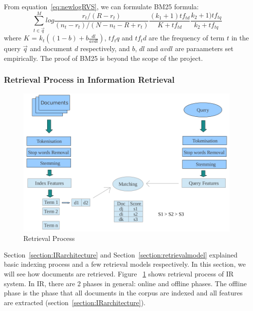 From equation~\ref{eq:newlogRVS}, we can formulate BM25 formula:
\begin{equation}~\label{eq:BM25}
\sum_{t \in \vec{q}}^M log \frac{r_t/(R - r_t)}{(n_t - r_t)/(N - n_t - R + r_t)} \frac{(k_1 + 1)tf_{td}}{K + tf_{td}} \frac{k_2 + 1)tf_{tq}}{k_2 + tf_{tq}}
\end{equation}
where $K$ = $k_t((1 - b) + b\frac{dl}{avdl})$, $tf_tq$ and $tf_td$ are the frequency of term $t$ in the query $\vec{q}$ and document $d$ respectively,
and $b$, $dl$ and $avdl$ are paraameters set empirically. The proof of BM25 is beyond the scope of the project.


\subsubsection{Retrieval Process in Information Retrieval}\label{section:retrieving}
\begin{figure}
\centering
\includegraphics[scale=0.3]{./figures/retrieval.png}
\caption{Retrieval Process} \label{fig:retrieval} 
\end{figure}
Section~\ref{section:IRarchitecture} and Section~\ref{section:retrievalmodel} explained basic indexing process and a few retrieval models respectively.
In this section, we will see how documents are retrieved. Figure ~\ref{fig:retrieval} shows
retrieval process of IR system. In IR, there are 2 phases in general:
online and offline phases. The offline phase is the phase that all documents in the corpus are indexed and all features are extracted 
(section~\ref{section:IRarchitecture}). 


